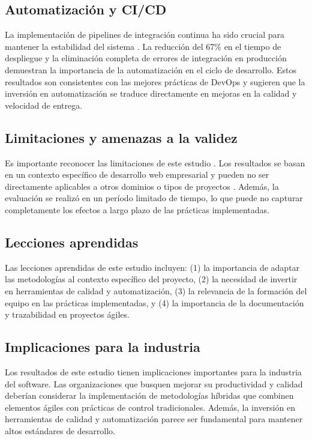 \subsection{Automatización y CI/CD}

La implementación de pipelines de integración continua \cite{fowler2006continuous} ha sido crucial para mantener la estabilidad del sistema \cite{forsgren2018accelerate}. La reducción del 67\% en el tiempo de despliegue y la eliminación completa de errores de integración en producción demuestran la importancia de la automatización en el ciclo de desarrollo. Estos resultados son consistentes con las mejores prácticas de DevOps \cite{chen2015devops} y sugieren que la inversión en automatización se traduce directamente en mejoras en la calidad y velocidad de entrega.

\subsection{Limitaciones y amenazas a la validez}

Es importante reconocer las limitaciones de este estudio \cite{fitzpatrick2017risks}. Los resultados se basan en un contexto específico de desarrollo web empresarial y pueden no ser directamente aplicables a otros dominios o tipos de proyectos \cite{limitations2021agile}. Además, la evaluación se realizó en un período limitado de tiempo, lo que puede no capturar completamente los efectos a largo plazo de las prácticas implementadas.

\subsection{Lecciones aprendidas}

Las lecciones aprendidas de este estudio incluyen: (1) la importancia de adaptar las metodologías al contexto específico del proyecto, (2) la necesidad de invertir en herramientas de calidad y automatización, (3) la relevancia de la formación del equipo en las prácticas implementadas, y (4) la importancia de la documentación y trazabilidad en proyectos ágiles.

\subsection{Implicaciones para la industria}

Los resultados de este estudio tienen implicaciones importantes para la industria del software. Las organizaciones que busquen mejorar su productividad y calidad deberían considerar la implementación de metodologías híbridas que combinen elementos ágiles con prácticas de control tradicionales. Además, la inversión en herramientas de calidad y automatización parece ser fundamental para mantener altos estándares de desarrollo.